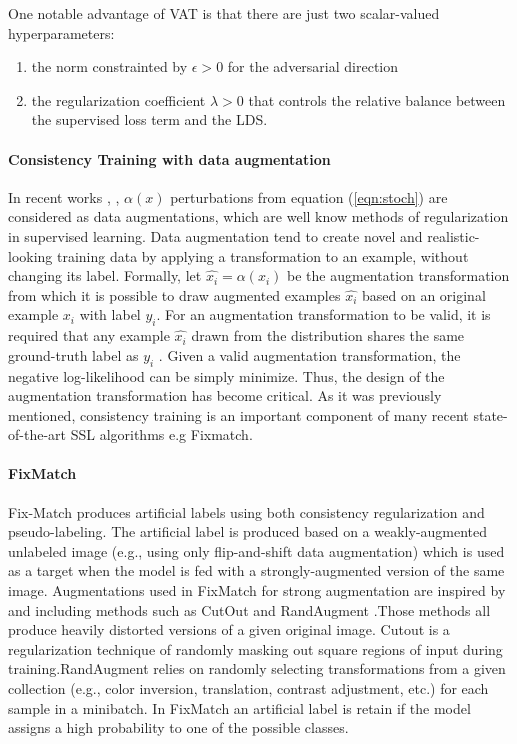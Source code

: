 \documentclass[12pt]{article}
\theoremstyle{definition}
\DeclareRobustCommand{\[}{\begin{equation}}
\DeclareRobustCommand{\]}{\end{equation}}
\begin{document}
        One notable advantage of VAT is that there are just two scalar-valued hyperparameters:
        \begin{enumerate}
            \item the norm constrainted by $\epsilon > 0$ for the adversarial direction
            \item the regularization coefficient $\lambda > 0$ that controls the relative balance between the supervised loss term and the LDS. 
        \end{enumerate}
    	
    	\paragraph{Consistency Training with data augmentation}
    	In recent works \cite{UDA}, \cite{MixMatch}, \cite{ReMixMatch} $\alpha(x)$ perturbations from equation (\ref{eqn:stoch})  are considered as data augmentations, which are well know methods of regularization in supervised learning. Data augmentation tend to create novel and realistic-looking training data by applying a transformation
        to an example, without changing its label. Formally, let $\hat{x_i} = \alpha(x_i)$  be the augmentation
        transformation from which it is possible to draw augmented examples $\hat{x_i}$ based on an original example $x_i$ with label $y_i$.
        For an augmentation transformation to be valid, it is required that any example $\hat{x_i}$  drawn
        from the distribution shares the same ground-truth label as $y_i$ . Given a valid augmentation transformation,
        the negative log-likelihood can be simply minimize. Thus, the design of the
        augmentation transformation has become critical.
        As it was previously mentioned, consistency training is an important component of
        many recent state-of-the-art SSL algorithms e.g Fixmatch.  
    	   
	    \paragraph{FixMatch}
        Fix-Match produces artificial labels using both consistency
        regularization and pseudo-labeling. The artificial label is produced based on a weakly-augmented unlabeled
        image (e.g., using only flip-and-shift data augmentation) which is used as a target when the model is fed with a
        strongly-augmented version of the same image. Augmentations used in FixMatch for strong augmentation are inspired by \cite{UDA} and \cite{ReMixMatch} including methods such as CutOut \cite{Cutout} and RandAugment \cite{RandAugment}.Those methods all produce heavily distorted versions of a given original image. Cutout is a regularization technique of randomly masking out square regions of input during training.RandAugment relies on randomly selecting transformations from a given collection (e.g., color inversion, translation, contrast adjustment, etc.) for each sample in a minibatch. In FixMatch an artificial label is retain if the model assigns a high probability to one of the possible classes.
        
\end{document}
